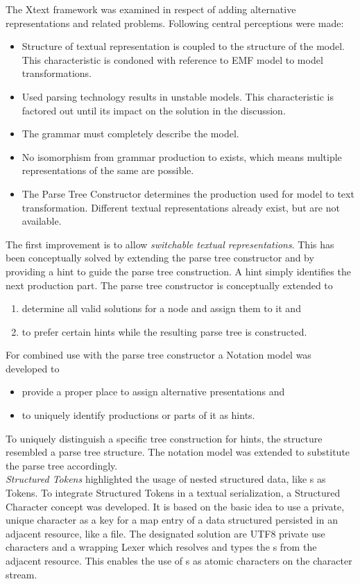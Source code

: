 The Xtext framework was examined in respect of adding alternative representations and related problems. Following central perceptions were made:
\begin{itemize}
	\item Structure of textual representation is coupled to the structure of the model. This characteristic is condoned with reference to EMF model to model transformations.
	\item Used parsing technology results in unstable models. This characteristic is factored out until its impact on the solution in the discussion.
	\item The grammar must completely describe the model. 
	\item No isomorphism from grammar production to  exists, which means multiple representations of the same  are possible.
	\item The Parse Tree Constructor determines the production used for model to text transformation. Different textual representations already exist, but are not available. \\
\end{itemize}
 
 
The first improvement is to allow \emph{switchable textual representations}. This has been conceptually solved by extending the parse tree constructor and by providing a hint to guide the parse tree construction. A hint simply identifies the next production part.
The parse tree constructor is conceptually extended to
\begin{enumerate}
	\item determine all valid solutions for a node and assign them to it and
	\item to prefer certain hints while the resulting parse tree is constructed.
\end{enumerate}
For combined use with the parse tree constructor a Notation model was developed to
\begin{itemize}
	\item provide a proper place to assign alternative presentations and
	\item to uniquely identify productions or parts of it as hints.
\end{itemize}
To uniquely distinguish a specific tree construction for hints, the structure resembled a parse tree structure. The notation model was extended to substitute the parse tree accordingly.\\


\emph{Structured Tokens} highlighted the usage of nested structured data, like s as Tokens. To integrate Structured Tokens in a textual serialization, a Structured Character concept was developed. It is based on the basic idea to use a private, unique character as a key for a map entry of a data structured persisted in an adjacent resource, like a file. The designated solution are UTF8 private use characters and a wrapping Lexer which resolves and types the s from the adjacent resource. This enables the use of s as atomic characters on the character stream. \\

